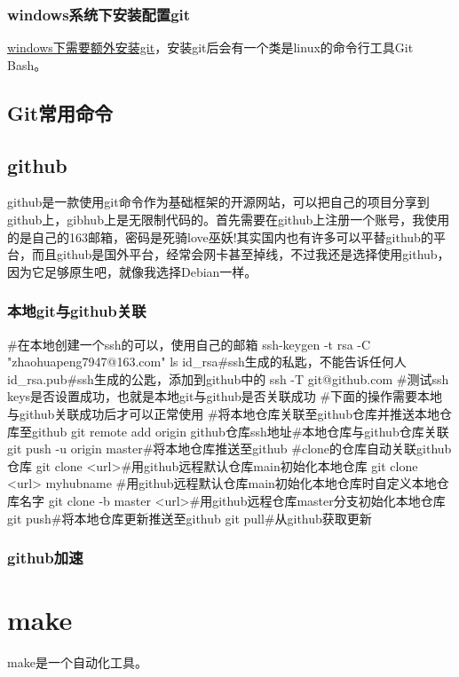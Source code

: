 \subsubsection{windows系统下安装配置git}
\href{https://blog.csdn.net/weixin_30824277/article/details/98382857?spm=1001.2014.3001.5506}{windows下需要额外安装git}，安装git后会有一个类是linux的命令行工具Git Bash。
\subsection{Git常用命令}
\subsection{github}
github是一款使用git命令作为基础框架的开源网站，可以把自己的项目分享到github上，gibhub上是无限制代码的。首先需要在github上注册一个账号，我使用的是自己的163邮箱，密码是死骑love巫妖!其实国内也有许多可以平替github的平台，而且github是国外平台，经常会网卡甚至掉线，不过我还是选择使用github，因为它足够原生吧，就像我选择Debian一样。
\subsubsection{本地git与github关联}
\begin{shell}
#在本地创建一个ssh的可以，使用自己的邮箱
ssh-keygen -t rsa -C "zhaohuapeng7947@163.com"
ls
id_rsa#ssh生成的私匙，不能告诉任何人
id_rsa.pub#ssh生成的公匙，添加到github中的
ssh -T git@github.com
#测试ssh keys是否设置成功，也就是本地git与github是否关联成功
#下面的操作需要本地与github关联成功后才可以正常使用
#将本地仓库关联至github仓库并推送本地仓库至github
git remote add origin github仓库ssh地址#本地仓库与github仓库关联
git push -u origin master#将本地仓库推送至github
#clone的仓库自动关联github仓库
git clone <url>#用github远程默认仓库main初始化本地仓库
git clone <url> myhubname
#用github远程默认仓库main初始化本地仓库时自定义本地仓库名字
git clone -b master <url>#用github远程仓库master分支初始化本地仓库
git push#将本地仓库更新推送至github
git pull#从github获取更新

\end{shell}
\subsubsection{github加速}


\section{make}
make是一个自动化工具。
